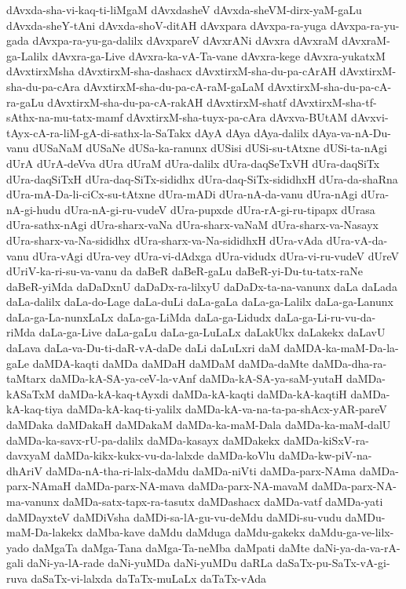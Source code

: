 {dAvxda-sha-vi-kaq-ti-liMgaM
dAvxdasheV
dAvxda-sheVM-dirx-yaM-gaLu
dAvxda-sheY-tAni
dAvxda-shoV-ditAH
dAvxpara
dAvxpa-ra-yuga
dAvxpa-ra-yu-gada
dAvxpa-ra-yu-ga-dalilx
dAvxpareV
dAvxrANi
dAvxra
dAvxraM
dAvxraM-ga-Lalilx
dAvxra-ga-Live
dAvxra-ka-vA-Ta-vane
dAvxra-kege
dAvxra-yukatxM
dAvxtirxMsha
dAvxtirxM-sha-dashacx
dAvxtirxM-sha-du-pa-cArAH
dAvxtirxM-sha-du-pa-cAra
dAvxtirxM-sha-du-pa-cA-raM-gaLaM
dAvxtirxM-sha-du-pa-cA-ra-gaLu
dAvxtirxM-sha-du-pa-cA-rakAH
dAvxtirxM-shatf
dAvxtirxM-sha-tf-sAthx-na-mu-tatx-mamf
dAvxtirxM-sha-tuyx-pa-cAra
dAvxva-BUtAM
dAvxvi-tAyx-cA-ra-liM-gA-di-sathx-la-SaTakx
dAyA
dAya
dAya-dalilx
dAya-va-nA-Du-vanu
dUSaNaM
dUSaNe
dUSa-ka-ranunx
dUSisi
dUSi-su-tAtxne
dUSi-ta-nAgi
dUrA
dUrA-deVva
dUra
dUraM
dUra-dalilx
dUra-daqSeTxVH
dUra-daqSiTx
dUra-daqSiTxH
dUra-daq-SiTx-sididhx
dUra-daq-SiTx-sididhxH
dUra-da-shaRna
dUra-mA-Da-li-ciCx-su-tAtxne
dUra-mADi
dUra-nA-da-vanu
dUra-nAgi
dUra-nA-gi-hudu
dUra-nA-gi-ru-vudeV
dUra-pupxde
dUra-rA-gi-ru-tipapx
dUrasa
dUra-sathx-nAgi
dUra-sharx-vaNa
dUra-sharx-vaNaM
dUra-sharx-va-Nasayx
dUra-sharx-va-Na-sididhx
dUra-sharx-va-Na-sididhxH
dUra-vAda
dUra-vA-da-vanu
dUra-vAgi
dUra-vey
dUra-vi-dAdxga
dUra-vidudx
dUra-vi-ru-vudeV
dUreV
dUriV-ka-ri-su-va-vanu
da
daBeR
daBeR-gaLu
daBeR-yi-Du-tu-tatx-raNe
daBeR-yiMda
daDaDxnU
daDaDx-ra-lilxyU
daDaDx-ta-na-vanunx
daLa
daLada
daLa-dalilx
daLa-do-Lage
daLa-duLi
daLa-gaLa
daLa-ga-Lalilx
daLa-ga-Lanunx
daLa-ga-La-nunxLaLx
daLa-ga-LiMda
daLa-ga-Lidudx
daLa-ga-Li-ru-vu-da-riMda
daLa-ga-Live
daLa-gaLu
daLa-ga-LuLaLx
daLakUkx
daLakekx
daLavU
daLava
daLa-va-Du-ti-daR-vA-daDe
daLi
daLuLxri
daM
daMDA-ka-maM-Da-la-gaLe
daMDA-kaqti
daMDa
daMDaH
daMDaM
daMDa-daMte
daMDa-dha-ra-taMtarx
daMDa-kA-SA-ya-ceV-la-vAnf
daMDa-kA-SA-ya-saM-yutaH
daMDa-kASaTxM
daMDa-kA-kaq-tAyxdi
daMDa-kA-kaqti
daMDa-kA-kaqtiH
daMDa-kA-kaq-tiya
daMDa-kA-kaq-ti-yalilx
daMDa-kA-va-na-ta-pa-shAcx-yAR-pareV
daMDaka
daMDakaH
daMDakaM
daMDa-ka-maM-Dala
daMDa-ka-maM-dalU
daMDa-ka-savx-rU-pa-dalilx
daMDa-kasayx
daMDakekx
daMDa-kiSxV-ra-davxyaM
daMDa-kikx-kukx-vu-da-lalxde
daMDa-koVlu
daMDa-kw-piV-na-dhAriV
daMDa-nA-tha-ri-lalx-daMdu
daMDa-niVti
daMDa-parx-NAma
daMDa-parx-NAmaH
daMDa-parx-NA-mava
daMDa-parx-NA-mavaM
daMDa-parx-NA-ma-vanunx
daMDa-satx-tapx-ra-tasutx
daMDashacx
daMDa-vatf
daMDa-yati
daMDayxteV
daMDiVsha
daMDi-sa-lA-gu-vu-deMdu
daMDi-su-vudu
daMDu-maM-Da-lakekx
daMba-kave
daMdu
daMduga
daMdu-gakekx
daMdu-ga-ve-lilx-yado
daMgaTa
daMga-Tana
daMga-Ta-neMba
daMpati
daMte
daNi-ya-da-va-rA-gali
daNi-ya-lA-rade
daNi-yuMDa
daNi-yuMDu
daRLa
daSaTx-pu-SaTx-vA-gi-ruva
daSaTx-vi-lalxda
daTaTx-muLaLx
daTaTx-vAda
}
